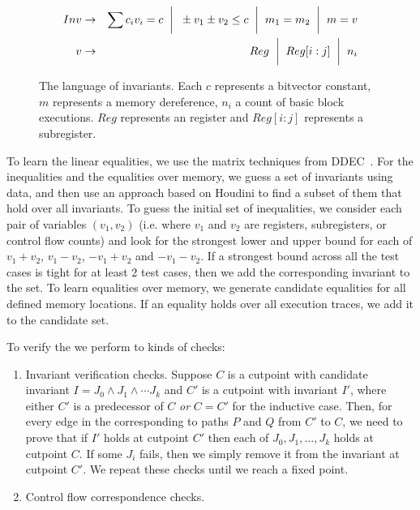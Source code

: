 \begin{figure}
\begin{eqnarray*}
Inv &\rightarrow& \sum c_iv_i = c \hspace{2mm}\bigg|\hspace{2mm} \pm v_1 \pm v_2 \leq c \hspace{2mm}\bigg|\hspace{2mm} m_1 = m_2 \hspace{2mm}\bigg|\hspace{2mm} m = v\\
v   &\rightarrow& Reg \hspace{2mm}\bigg|\hspace{2mm}  Reg[i:j]  \hspace{2mm}\bigg|\hspace{2mm} n_i\\
\end{eqnarray*}
\caption{The language of invariants.  Each $c$ represents a bitvector constant, $m$ represents a memory dereference, $n_i$ a count of basic block executions.  $Reg$ represents an \arch{} register and $Reg[i:j]$ represents a subregister.}
\label{fig:invlang}
\end{figure}

To learn the linear equalities, we use the matrix techniques from
DDEC~\cite{Sharma2013}. For the inequalities and the equalities over
memory, we guess a set of invariants using data, and then use an
approach based on Houdini to find a subset of them that
hold over all invariants. To guess the initial set of inequalities,
we consider each pair of variables $(v_1, v_2)$ (i.e. where $v_1$ and
$v_2$ are registers, subregisters, or control flow counts) and look
for the strongest lower and upper bound for each of $v_1 + v_2$, $v_1
- v_2$, $-v_1 + v_2$ and $-v_1-v_2$. If a strongest bound across all
the test cases is tight for at least 2 test cases, then we add the
corresponding invariant to the set. To learn equalities over memory,
we generate candidate equalities for all defined memory locations.
If an equality holds over all execution traces, we add it to the
candidate set.

To verify the \bisimrep{} we perform to kinds of checks:

\begin{enumerate}
\item Invariant verification checks. Suppose $C$ is a cutpoint with
candidate invariant $I = J_0 \wedge J_1 \wedge \dotsm J_k$ and $C'$ is
a cutpoint with invariant $I'$, where either $C'$ is a predecessor of
$C$ \emph{or} $C = C'$ for the inductive case. Then, for every edge
in the \bisimrep{} corresponding to paths $P$ and $Q$ from $C'$ to
$C$, we need to prove that if $I'$ holds at cutpoint $C'$ then each of
$J_0,J_1,\dotsc,J_k$ holds at cutpoint $C$. If some $J_i$ fails, then
we simply remove it from the invariant at cutpoint $C'$. We repeat
these checks until we reach a fixed point.
\item Control flow correspondence checks.
\end{enumerate}
